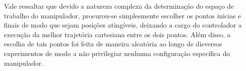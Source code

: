 Vale ressaltar que devido a natureza complexa da determinação do espaço 
de trabalho do manipulador, procurou-se simplesmente escolher 
os pontos inicias e finais de modo que sejam posições atingíveis, deixando a 
cargo do controlador a execução da melhor trajetória cartesiana entre os dois pontos.
Além disso, a escolha de tais pontos foi feita de maneira aleatória ao longo de disversos experimentos
de modo a não privilegiar nenhuma configuração específica do manipulador.